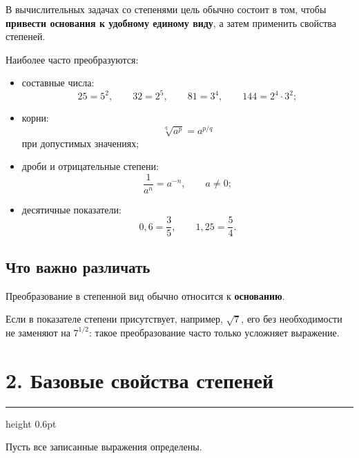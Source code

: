 \documentclass[a4paper,12pt]{article}
\newcommand{\sectionline}{
  \par
  \vspace{0.2em}
  {\color{accent}\hrule height 0.6pt}
  \vspace{0.8em}
}
\begin{document}
В вычислительных задачах со степенями цель обычно состоит в том, чтобы
\textbf{привести основания к удобному единому виду}, а затем применить
свойства степеней.

Наиболее часто преобразуются:

\begin{itemize}
  \item составные числа:
  \[
  25=5^2,\qquad
  32=2^5,\qquad
  81=3^4,\qquad
  144=2^4\cdot3^2;
  \]

  \item корни:
  \[
  \sqrt[q]{a^p}=a^{p/q}
  \]
  при допустимых значениях;

  \item дроби и отрицательные степени:
  \[
  \frac{1}{a^n}=a^{-n},\qquad a\ne0;
  \]

  \item десятичные показатели:
  \[
  0{,}6=\frac35,
  \qquad
  1{,}25=\frac54.
  \]
\end{itemize}

\subsection*{Что важно различать}

Преобразование в степенной вид обычно относится к
\textbf{основанию}.

Если в показателе степени присутствует, например, $\sqrt7$, его без
необходимости не заменяют на $7^{1/2}$: такое преобразование часто
только усложняет выражение.


\section*{2. Базовые свойства степеней}
\sectionline

Пусть все записанные выражения определены.
\end{document}
